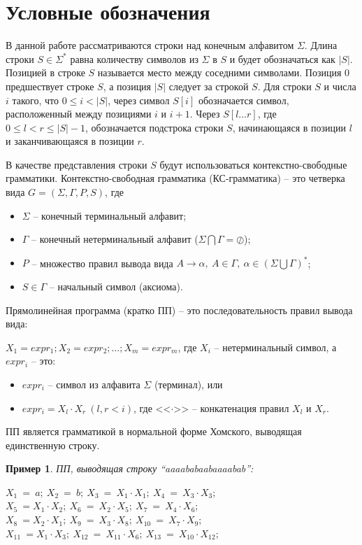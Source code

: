 \documentclass[12pt,a4paper]{extarticle}
\theoremstyle{break}
\newtheorem{example}{Пример}
\begin{document}
\newpage
\section{Условные обозначения}
В данной работе рассматриваются строки над конечным алфавитом $\Sigma$.
Длина строки $S \in \Sigma^*$ равна количеству символов из $\Sigma$ в $S$ и
будет обозначаться как $|S|$.
Позицией в строке $S$ называется место между соседними символами.
Позиция 0 предшествует строке $S$, а позиция $|S|$ следует за строкой $S$. Для строки $S$
и числа $i$ такого, что $0 \leq i < |S|$, через символ $S[i]$ обозначается
символ, расположенный между позициями $i$ и $i+1$. Через $S[l\ldots r]$, где $0
\leq l < r \leq |S| - 1$, обозначается подстрока строки $S$, начинающаяся в
позиции $l$ и заканчивающаяся в позиции $r$. 

В качестве представления строки $S$ будут использоваться
контекстно-свободные грамматики. Контекстно-свободная грамматика
(КС-грамматика) -- это четверка вида $G = (\Sigma, \Gamma, P, S)$, где 
\begin{itemize}
\item $\Sigma$ -- конечный терминальный алфавит;
\item $\Gamma$ -- конечный нетерминальный алфавит ($\Sigma \bigcap \Gamma =
\oslash$);
\item $P$ -- множество правил вывода вида $A \rightarrow \alpha,\ A \in \Gamma,
\ \alpha \in (\Sigma \bigcup \Gamma)^*$;
\item $S \in \Gamma$ -- начальный символ (аксиома).
\end{itemize}

Прямолинейная программа (кратко ПП) -- это последовательность правил вывода
вида:

$X_1 = expr_1; X_2 = expr_2; \ldots; X_m = expr_m$,
где $X_i$ -- нетерминальный символ, а $expr_i$ -- это:
\begin{itemize}
\item $expr_i$ -- символ из алфавита $\Sigma$ (терминал), или
\item $expr_i = X_l \cdot X_r\ (l, r < i)$, где <<$\cdot$>> -- конкатенация
правил $X_l$ и $X_r$.
\end{itemize}

ПП является грамматикой в нормальной форме Хомского, выводящая единственную
строку.

\begin{example}
ПП, выводящая строку ``aaaababaabaaaabab'':
	\begin{center} 
		$X_1\ =\ a;\ X_2\ =\ b;\ X_3\ =\ X_1\cdot X_1;\ X_4\ =\ X_3\cdot X_3;$
		\\
		$X_5\ = X_1\cdot X_2;\ X_6\ =\ X_2\cdot X_5;\ X_7\ =\ X_4\cdot X_6;$
		\\
		$X_8\ = X_2\cdot X_1;\ X_9\ =\ X_3\cdot X_8;\ X_{10}\ =\ X_7\cdot X_9;$
		\\
		$X_{11}\ = X_1\cdot X_3;\ X_{12}\ =\ X_{11}\cdot X_6;\ X_{13}\ =\ X_{10}\cdot
		X_{12};$
	\end{center}
\end{example}
\end{document}
